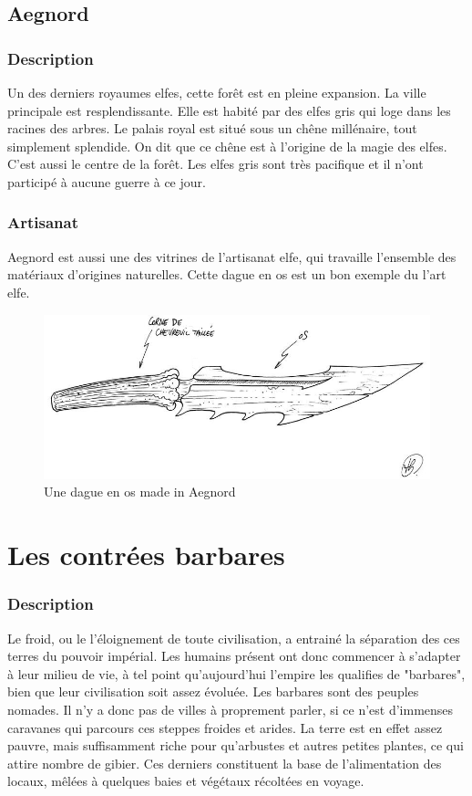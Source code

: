 \subsection{Aegnord}
\subsubsection{Description}
\hypertarget{aegnord}{}Un des derniers royaumes elfes, cette forêt est en pleine expansion.
La ville principale est resplendissante.
Elle est habité par des elfes gris qui loge dans les racines des arbres.
Le palais royal est situé sous un chêne millénaire, tout simplement splendide.
On dit que ce chêne est à l'origine de la magie des elfes. C'est aussi le centre de la forêt.
Les elfes gris sont très pacifique et il n'ont participé à aucune guerre à ce jour. 
\subsubsection{Artisanat}
Aegnord est aussi une des vitrines de l'artisanat elfe, qui travaille l'ensemble des matériaux d'origines naturelles. Cette dague en os est un bon exemple du l'art elfe.
\begin{figure}[h]
\begin{center}
\includegraphics[scale=0.4]{./Ressources/medieval/dague_1.jpg}
\caption{Une dague en os made in Aegnord}
\end{center}
\end{figure}
\section{Les contrées barbares}
\subsubsection{Description}
\hypertarget {lescontreesbarbares}{}
Le froid, ou le l'éloignement de toute civilisation, a entrainé la séparation des ces terres du pouvoir impérial. Les humains présent ont donc commencer à s'adapter à leur milieu de vie, à tel point qu'aujourd'hui l'empire les qualifies de "barbares", bien que leur civilisation soit assez évoluée.
Les barbares sont des peuples nomades. Il n'y a donc pas de villes à proprement parler, si ce n'est d'immenses caravanes qui parcours ces steppes froides et arides.
La terre est en effet assez pauvre, mais suffisamment riche pour qu'arbustes et autres  petites plantes, ce qui attire nombre de gibier. Ces derniers constituent la base de l'alimentation des locaux, mêlées à quelques baies et végétaux récoltées en voyage.
